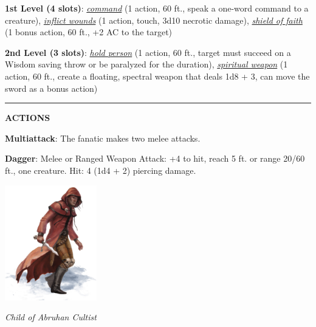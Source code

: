 \textbf{1st Level (4 slots)}: \emph{\underline{command}} (1 action, 60 ft., speak a one-word command to a creature), \emph{\underline{inflict wounds}} (1 action, touch, 3d10 necrotic damage), \emph{\underline{shield of faith}} (1 bonus action, 60 ft., +2 AC to the target)

\textbf{2nd Level (3 slots)}: \emph{\underline{hold person}} (1 action, 60 ft., target must succeed on a Wisdom saving throw or be paralyzed for the duration), \emph{\underline{spiritual weapon}} (1 action, 60 ft., create a floating, spectral weapon that deals 1d8 + 3, can move the sword as a bonus action)

\noindent\rule{0.5\textwidth}{0.5pt}

\noindent\textbf{ACTIONS}

\noindent\textbf{Multiattack}: The fanatic makes two melee attacks.

\noindent\textbf{Dagger}: Melee or Ranged Weapon Attack: +4 to hit, reach 5 ft. or range 20/60 ft., one creature. Hit: 4 (1d4 + 2) piercing damage.

\begin{center}
	\includegraphics[width = 0.3\textwidth]{child-of-abruhan-cultist}
	
	\emph{Child of Abruhan Cultist}
\end{center}